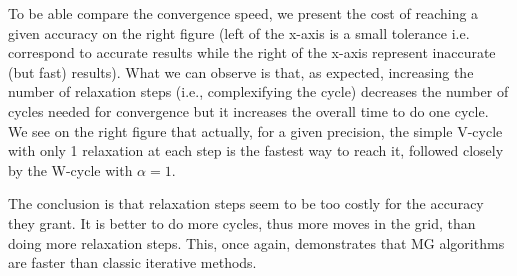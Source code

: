 To be able compare the convergence speed, we present the cost of reaching a
given accuracy on the right figure (left of the x-axis is a small tolerance
i.e.  correspond to accurate results while the right of the x-axis represent
inaccurate (but fast) results). What we can observe is that, as expected,
increasing the number of relaxation steps (i.e., complexifying the cycle)
decreases the number of cycles needed for convergence but it increases the
overall time to do one cycle. We see on the right figure that actually, for a
given precision, the simple V-cycle with only 1 relaxation at each step is the
fastest way to reach it, followed closely by the W-cycle with $\alpha=1$.

The conclusion is that relaxation steps seem to be too costly for the accuracy
they grant. It is better to do more cycles, thus more moves in the grid, than
doing more relaxation steps. This, once again, demonstrates that MG algorithms
are faster than classic iterative methods.



